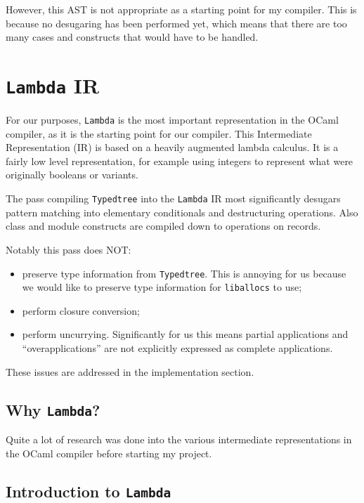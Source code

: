 \documentclass[12pt,a4paper,twoside,openright]{report}
\begin{document}
However, this AST is not appropriate as a starting point for my compiler. This
is because no desugaring has been performed yet, which means that there are too
many cases and constructs that would have to be handled.

\section{\texttt{Lambda} IR}

For our purposes, \lstinline!Lambda! is the most important representation in
the OCaml compiler, as it is the starting point for our compiler. This
Intermediate Representation (IR) is based on a heavily augmented lambda calculus.
It is a fairly low level representation, for example using integers to represent
what were originally booleans or variants.

The pass compiling \lstinline!Typedtree! into the \lstinline!Lambda! IR most
significantly desugars pattern matching into elementary conditionals and
destructuring operations. Also class and module constructs are compiled down to
operations on records.

Notably this pass does NOT:
\begin{itemize}
    \item preserve type information from \lstinline!Typedtree!. This is annoying
        for us because we would like to preserve type information for
        \lstinline!liballocs! to use;
    \item perform closure conversion;
    \item perform uncurrying. Significantly for us this means
        partial applications and ``overapplications'' are not explicitly
    expressed as complete applications.
\end{itemize}

These issues are addressed in the implementation section.

\subsection{Why \texttt{Lambda}?}\label{why-lambda}

Quite a lot of research was done into the various intermediate representations in the OCaml compiler before starting my project.



\subsection{Introduction to \texttt{Lambda}}\label{introduction-to-lambda}
\end{document}
